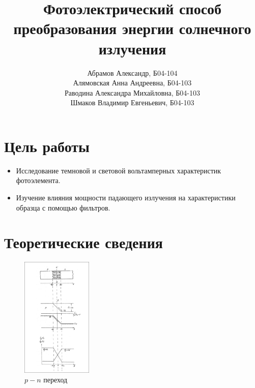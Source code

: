 \documentclass[a4paper, 12pt]{extarticle}
\title{\textcolor{main_title}{Фотоэлектрический способ преобразования энергии солнечного излучения}}
\author{%
    {Абрамов Александр, Б04-104} \\
    {Алямовская Анна Андреевна, Б04-103}\\
    {Раводина Александра Михайловна, Б04-103} \\
    {Шмаков Владимир Евгеньевич, Б04-103}%
}
\begin{document}
\maketitle



\section*{\textcolor{header}{Цель работы}}

\begin{itemize}
    \item Исследование темновой и световой вольтамперных характеристик фотоэлемента.
    \item Изучение влияния мощности падающего излучения на характеристики образца с помощью фильтров.
\end{itemize}

\section*{\textcolor{header}{Теоретические сведения}}



\begin{figure}[htbp]
    \centering
    \includegraphics[width = 0.3\textwidth]{pics/diode.png}
    \caption{$p-n$ переход}
    \label{fig:diode}
\end{figure}
\end{document}
